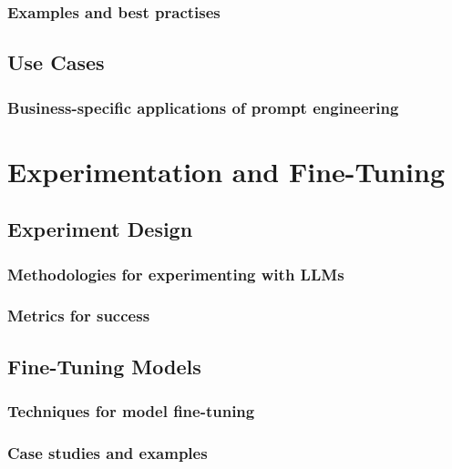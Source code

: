 \subsubsection{Examples and best practises}

\subsection{Use Cases}
\subsubsection{Business-specific applications of prompt engineering}

\section{Experimentation and Fine-Tuning}
\subsection{Experiment Design}
\subsubsection{Methodologies for experimenting with LLMs}
\subsubsection{Metrics for success}

\subsection{Fine-Tuning Models}
\subsubsection{Techniques for model fine-tuning}
\subsubsection{Case studies and examples}
